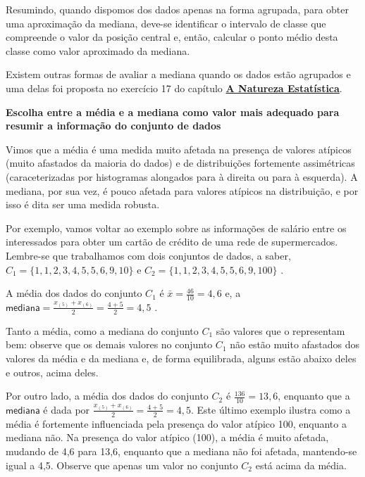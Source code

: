 Resumindo, quando dispomos dos dados apenas na forma agrupada, para obter uma aproximação da mediana, deve-se identificar o intervalo de classe que compreende o valor da posição central e, então, calcular o ponto médio desta classe como valor aproximado da mediana.

Existem outras formas de avaliar a mediana quando os dados estão agrupados e uma delas foi proposta no exercício 17 do capítulo \textbf{\hyperref[est1-chap]{A Natureza Estatística}}.

\textbf{Escolha entre a média e a mediana como valor mais adequado para resumir a informação do conjunto de dados}

Vimos que a média é uma medida muito afetada na presença de valores atípicos (muito afastados da maioria do dados) e de distribuições fortemente assimétricas (caraceterizadas por histogramas alongados para à direita ou para à esquerda). A mediana, por sua vez, é pouco afetada para valores atípicos na distribuição, e por isso é dita ser uma medida robusta.

Por exemplo, vamos voltar ao exemplo sobre as informações de salário entre os interessados para obter um cartão de crédito de uma rede de supermercados. Lembre-se que trabalhamos com dois conjuntos de dados, a saber, \(C_1=\{1, 1, 2, 3, 4, 5, 5, 6, 9, 10\}\) e \(C_2=\{1, 1, 2, 3, 4, 5, 5, 6, 9, 100\}\) .

A média dos dados do conjunto \(C_1\) é \(\displaystyle \bar{x}=\frac{46}{10}=4,6\) e, a \(\displaystyle \textsf{mediana}=\frac{x_{(5)}+x_{(6)}}{2}=\frac{4+5}{2}=4,5\) .

Tanto a média, como a mediana do conjunto \(C_1\) são valores que o representam bem: observe que os demais valores no conjunto \(C_1\) não estão muito afastados dos valores da média e da mediana e, de forma equilibrada, alguns estão abaixo deles e outros, acima deles.

Por outro lado, a média dos dados do conjunto \(C_2\) é \(\displaystyle \frac{136}{10}=13,6\), enquanto que a \(\textsf{mediana}\) é dada por  \(\displaystyle \frac{x_{(5)}+x_{(6)}}{2}=\frac{4+5}{2}=4,5\).  Este último exemplo ilustra como a média é fortemente influenciada pela presença do valor atípico 100, enquanto a mediana não.   Na presença do valor atípico (100), a média é muito afetada, mudando de 4,6 para 13,6, enquanto que a mediana não foi afetada, mantendo-se igual a 4,5.  Observe que apenas um valor no conjunto \(C_2\) está acima da média.

